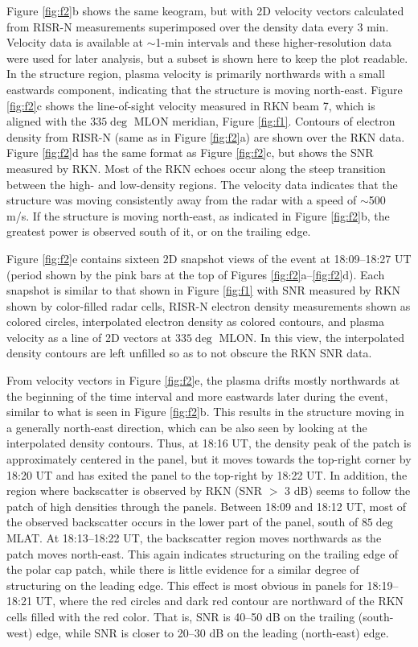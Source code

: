 Figure \ref{fig:f2}b shows the same keogram, but with 2D velocity vectors calculated from RISR-N measurements superimposed over the density data every 3 min.  Velocity data is available at \(\sim\)1-min intervals and these higher-resolution data were used for later analysis, but a subset is shown here to keep the plot readable. In the structure region, plasma velocity is primarily northwards with a small eastwards component, indicating that the structure is moving north-east.  Figure \ref{fig:f2}c shows the line-of-sight velocity measured in RKN beam 7, which is aligned with the \(335\deg\) MLON meridian, Figure \ref{fig:f1}. Contours of electron density from RISR-N (same as in Figure \ref{fig:f2}a) are shown over the RKN data. Figure \ref{fig:f2}d has the same format as Figure \ref{fig:f2}c, but shows the SNR measured by RKN. Most of the RKN echoes occur along the steep transition between the high- and low-density regions.  The velocity data indicates that the structure was moving consistently away from the radar with a speed of \(\sim\)500 m/s.  If the structure is moving north-east, as indicated in Figure \ref{fig:f2}b, the greatest power is observed south of it, or on the trailing edge.

Figure \ref{fig:f2}e contains sixteen 2D snapshot views of the event at 18:09--18:27 UT (period shown by the pink bars at the top of Figures \ref{fig:f2}a--\ref{fig:f2}d). Each snapshot is similar to that shown in Figure \ref{fig:f1} with SNR measured by RKN shown by color-filled radar cells, RISR-N electron density measurements shown as colored circles, interpolated electron density as colored contours, and plasma velocity as a line of 2D vectors at \(335\deg\) MLON. In this view, the interpolated density contours are left unfilled so as to not obscure the RKN SNR data.  

From velocity vectors in Figure \ref{fig:f2}e, the plasma drifts mostly northwards at the beginning of the time interval and more eastwards later during the event, similar to what is seen in Figure \ref{fig:f2}b. This results in the structure moving in a generally north-east direction, which can be also seen by looking at the interpolated density contours.  Thus, at 18:16 UT, the density peak of the patch is approximately centered in the panel, but it moves towards the top-right corner by 18:20 UT and has exited the panel to the top-right by 18:22 UT. In addition, the region where backscatter is observed by RKN (SNR \(>\) 3 dB) seems to follow the patch of high densities through the panels.  Between 18:09 and 18:12 UT, most of the observed backscatter occurs in the lower part of the panel, south of \(85\deg\) MLAT.  At 18:13--18:22 UT, the backscatter region moves northwards as the patch moves north-east.  This again indicates structuring on the trailing edge of the polar cap patch, while there is little evidence for a similar degree of structuring on the leading edge.  This effect is most obvious in panels for 18:19--18:21 UT, where the red circles and dark red contour are northward of the RKN cells filled with the red color.  That is, SNR is 40--50 dB on the trailing (south-west) edge, while SNR is closer to 20--30 dB on the leading (north-east) edge.

